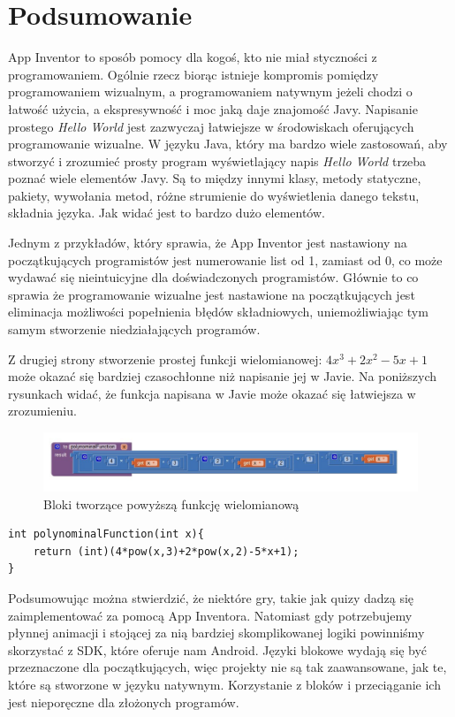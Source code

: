 \section{Podsumowanie}


App Inventor to sposób pomocy dla kogoś, kto nie miał styczności z programowaniem. Ogólnie rzecz biorąc istnieje kompromis pomiędzy programowaniem wizualnym, a programowaniem natywnym jeżeli chodzi o łatwość użycia, a ekspresywność i moc jaką daje znajomość Javy. Napisanie prostego \emph{Hello World} jest zazwyczaj łatwiejsze w środowiskach oferujących programowanie wizualne. W języku Java, który ma bardzo wiele zastosowań, aby stworzyć i zrozumieć prosty program wyświetlający napis \emph{Hello World} trzeba poznać wiele elementów Javy. Są to między innymi klasy, metody statyczne, pakiety, wywołania metod, różne strumienie do wyświetlenia danego tekstu, składnia języka. Jak widać jest to bardzo dużo elementów. 

Jednym z przykładów, który sprawia, że App Inventor jest nastawiony na początkujących programistów jest numerowanie list od 1, zamiast od 0, co może wydawać się nieintuicyjne dla doświadczonych programistów. Głównie to co sprawia że programowanie wizualne jest nastawione na początkujących jest eliminacja możliwości popełnienia błędów składniowych, uniemożliwiając tym samym stworzenie niedziałających programów. 

Z drugiej strony stworzenie prostej funkcji wielomianowej: $4x^3+2x^2-5x+1$ może okazać się bardziej czasochłonne niż napisanie jej w Javie. 
Na poniższych rysunkach widać, że funkcja napisana w Javie może okazać się łatwiejsza w zrozumieniu.


\begin{figure}[H]
\centering\includegraphics[width=15cm]{figures/polynominalFunction}
\caption{Bloki tworzące powyższą funkcję wielomianową}
\end{figure}

\begin{lstlisting}
int polynominalFunction(int x){
	return (int)(4*pow(x,3)+2*pow(x,2)-5*x+1);
}
\end{lstlisting}


Podsumowując można stwierdzić, że niektóre gry, takie jak quizy dadzą się zaimplementować za pomocą App Inventora. Natomiast gdy potrzebujemy płynnej animacji i stojącej za nią bardziej skomplikowanej logiki powinniśmy skorzystać z SDK, które oferuje nam Android. Języki blokowe wydają się być przeznaczone dla początkujących, więc projekty nie są tak zaawansowane, jak te, które są stworzone w języku natywnym. Korzystanie z bloków i przeciąganie ich jest nieporęczne dla złożonych programów.

